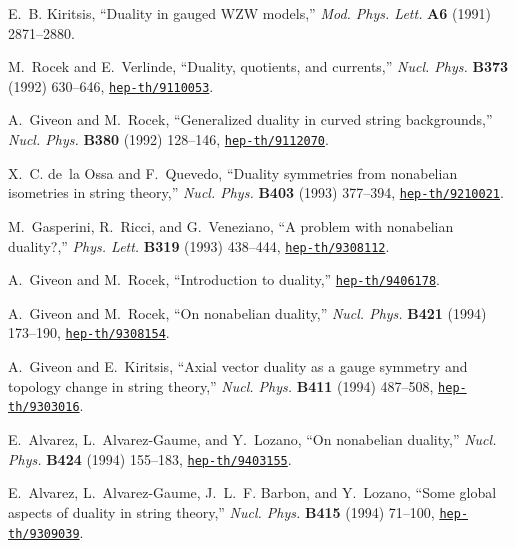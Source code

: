 \documentclass[a4paper,12pt]{article}
\begin{document}
\begin{thebibliography}{10}
E.~B. Kiritsis, ``Duality in gauged {WZW} models,'' {\em Mod. Phys. Lett.} {\bf
  A6} (1991)
2871--2880.

M.~Rocek and E.~Verlinde, ``Duality, quotients, and currents,'' {\em Nucl.
  Phys.} {\bf B373} (1992) 630--646,
\href{http://www.arXiv.org/abs/hep-th/9110053}{{\tt hep-th/9110053}}.

A.~Giveon and M.~Rocek, ``Generalized duality in curved string backgrounds,''
  {\em Nucl. Phys.} {\bf B380} (1992) 128--146,
\href{http://www.arXiv.org/abs/hep-th/9112070}{{\tt hep-th/9112070}}.

X.~C. de~la Ossa and F.~Quevedo, ``Duality symmetries from nonabelian
  isometries in string theory,'' {\em Nucl. Phys.} {\bf B403} (1993) 377--394,
\href{http://www.arXiv.org/abs/hep-th/9210021}{{\tt hep-th/9210021}}.

M.~Gasperini, R.~Ricci, and G.~Veneziano, ``A problem with nonabelian
  duality?,'' {\em Phys. Lett.} {\bf B319} (1993) 438--444,
\href{http://www.arXiv.org/abs/hep-th/9308112}{{\tt hep-th/9308112}}.

A.~Giveon and M.~Rocek, ``Introduction to duality,''
\href{http://www.arXiv.org/abs/hep-th/9406178}{{\tt hep-th/9406178}}.

A.~Giveon and M.~Rocek, ``On nonabelian duality,'' {\em Nucl. Phys.} {\bf B421}
  (1994) 173--190,
\href{http://www.arXiv.org/abs/hep-th/9308154}{{\tt hep-th/9308154}}.

A.~Giveon and E.~Kiritsis, ``Axial vector duality as a gauge symmetry and
  topology change in string theory,'' {\em Nucl. Phys.} {\bf B411} (1994)
  487--508,
\href{http://www.arXiv.org/abs/hep-th/9303016}{{\tt hep-th/9303016}}.

E.~Alvarez, L.~Alvarez-Gaume, and Y.~Lozano, ``On nonabelian duality,'' {\em
  Nucl. Phys.} {\bf B424} (1994) 155--183,
\href{http://www.arXiv.org/abs/hep-th/9403155}{{\tt hep-th/9403155}}.

E.~Alvarez, L.~Alvarez-Gaume, J.~L.~F. Barbon, and Y.~Lozano, ``Some global
  aspects of duality in string theory,'' {\em Nucl. Phys.} {\bf B415} (1994)
  71--100,
\href{http://www.arXiv.org/abs/hep-th/9309039}{{\tt hep-th/9309039}}.


\end{thebibliography}
\end{document}
